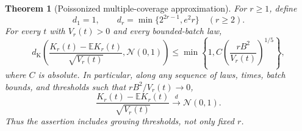 \documentclass[11pt]{article}
\numberwithin{equation}{section}
\newtheorem{theorem}{Theorem}[section]
\theoremstyle{definition}
\theoremstyle{remark}
\newcommand{\E}{\mathbb E}
\newcommand{\dK}{d_{\mathrm K}}
\newcommand{\Normal}{\mathcal N(0,1)}
\newcommand{\dto}{\xrightarrow{\ d\ }}
\begin{document}
\begin{theorem}[Poissonized multiple-coverage approximation]\label{thm:thresholdCLT}
For $r\ge1$, define
\begin{equation}\label{eq:dr}
 d_1=1,\qquad d_r=\min\{2^{2r-1},e^2r\}\quad(r\ge2).
\end{equation}
For every $t$ with $V_r(t)>0$ and every bounded-batch law,
\begin{equation}\label{eq:thresholdBE}
 \dK\left(\frac{K_r(t)-\E K_r(t)}{\sqrt{V_r(t)}},\Normal\right)
 \le\min\left\{1,C\left(\frac{rB^2}{V_r(t)}\right)^{1/5}\right\},
\end{equation}
where $C$ is absolute. In particular, along any sequence of laws, times,
batch bounds, and thresholds such that $rB^2/V_r(t)\to0$,
\begin{equation}\label{eq:thresholdCLT}
 \frac{K_r(t)-\E K_r(t)}{\sqrt{V_r(t)}}\dto\Normal.
\end{equation}
Thus the assertion includes growing thresholds, not only fixed $r$.
\end{theorem}
\end{document}
